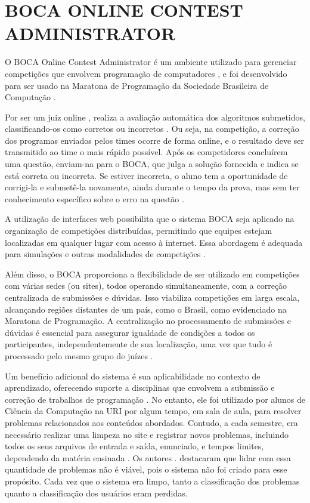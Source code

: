 \section{BOCA ONLINE CONTEST ADMINISTRATOR}

O BOCA Online Contest Administrator é um ambiente utilizado para gerenciar competições que envolvem programação de computadores \cite[p.~22]{galasso}, e foi desenvolvido para ser usado na Maratona de Programação da Sociedade Brasileira de Computação \cite[p.~2]{camposferreira}.

Por ser um juiz online \cite[p.~1]{beztonin2012}, realiza a avaliação automática dos algoritmos submetidos, classificando-os como corretos ou incorretos \cite[p.~22]{galasso}. Ou seja, na competição, a correção dos programas enviados pelos times ocorre de forma online, e o resultado deve ser transmitido ao time o mais rápido possível. Após os competidores concluírem uma questão, enviam-na para o BOCA, que julga a solução fornecida e indica se está correta ou incorreta. Se estiver incorreta, o aluno tem a oportunidade de corrigi-la e submetê-la novamente, ainda durante o tempo da prova, mas sem ter conhecimento específico sobre o erro na questão \cite[p.~4]{camposferreira}. 

A utilização de interfaces web possibilita que o sistema BOCA seja aplicado na organização de competições distribuídas, permitindo que equipes estejam localizadas em qualquer lugar com acesso à internet. Essa abordagem é adequada para simulações e outras modalidades de competições \cite[p.~20]{camposferreira}.
 
Além disso, o BOCA proporciona a flexibilidade de ser utilizado em competições com várias sedes (ou sites), todos operando simultaneamente, com a correção centralizada de submissões e dúvidas. Isso viabiliza competições em larga escala, alcançando regiões distantes de um país, como o Brasil, como evidenciado na Maratona de Programação. A centralização no processamento de submissões e dúvidas é essencial para assegurar igualdade de condições a todos os participantes, independentemente de sua localização, uma vez que tudo é processado pelo mesmo grupo de juízes \cite[p.~10-11]{camposferreira}.

Um benefício adicional do sistema é sua aplicabilidade no contexto de aprendizado, oferecendo suporte a disciplinas que envolvem a submissão e correção de trabalhos de programação \cite[p.~2]{camposferreira}. No entanto, ele foi utilizado por alunos de Ciência da Computação na URI por algum tempo, em sala de aula, para resolver problemas relacionados aos conteúdos abordados. Contudo, a cada semestre, era necessário realizar uma limpeza no site e registrar novos problemas, incluindo todos os seus arquivos de entrada e saída, enunciado, e tempos limites, dependendo da matéria ensinada \cite[p.~1]{beztonin2012}. Os autores \textcite[p.~1]{beztonin2012}. destacaram que lidar com essa quantidade de problemas não é viável, pois o sistema não foi criado para esse propósito. Cada vez que o sistema era limpo, tanto a classificação dos problemas quanto a classificação dos usuários eram perdidas.

